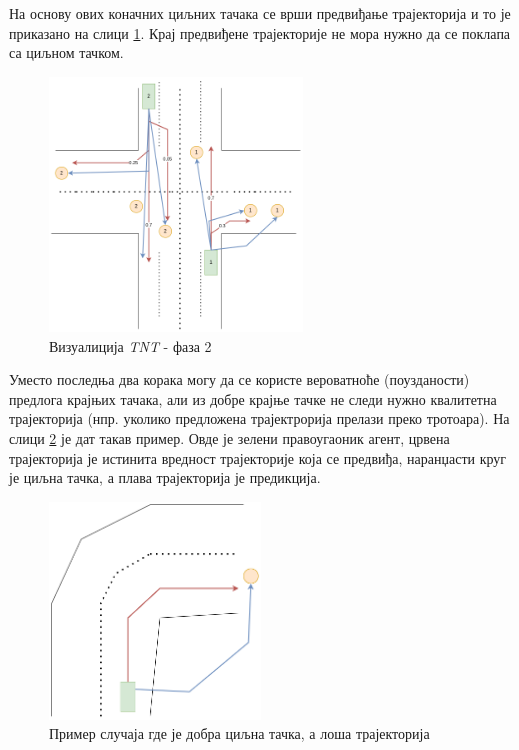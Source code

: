 \documentclass[11pt,oneside]{memoir}
\begin{document}
На основу ових коначних циљних тачака се врши предвиђање трајекторија и то је приказано на слици \ref{tnt-viz-2}. Крај предвиђене трајекторије не мора
нужно да се поклапа са циљном тачком.

\begin{figure}[H]
  \centering
  \includegraphics[width=0.6\textwidth]{images/tnt-viz-Page-2.drawio.png}
  \caption{Визуалиција \textit{TNT} - фаза 2 \label{tnt-viz-2}}
\end{figure}


Уместо последња два корака могу да се користе вероватноће (поузданости) предлога крајњих тачака, али из добре крајње тачке не следи
нужно квалитетна трајекторија (нпр. уколико предложена трајектрорија прелази преко тротоара). На слици \ref{tnt-good-target-bad-traj}
је дат такав пример. Овде је зелени правоугаоник агент, црвена трајекторија је истинита вредност трајекторије која се предвиђа, 
наранџасти круг је циљна тачка, а плава трајекторија је предикција. 

\begin{figure}[H]
  \centering
  \includegraphics[width=0.5\textwidth]{images/tnt-good-end-point-and-bad-traj.drawio.png}
  \caption{Пример случаја где је добра циљна тачка, а лоша трајекторија \label{tnt-good-target-bad-traj}}
\end{figure}
\end{document}
